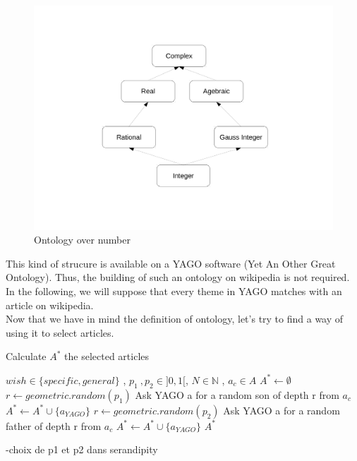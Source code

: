 \documentclass[11pt]{article}
\theoremstyle{plain}
\theoremstyle{definition}
\theoremstyle{remark}
\begin{document}
\begin{figure}[!h]
	\centering
    \includegraphics[scale = 0.3]{ExOntology.pdf}
    \caption{Ontology over number}
\end{figure}

This kind of strucure is available on a YAGO software (Yet An Other Great Ontology). Thus, the building of such an ontology on wikipedia is not required. In the following, we will suppose that every theme in YAGO matches with an article on wikipedia. \\
Now that we have in mind the definition of ontology, let's try to find a way of using it to select articles.\\


\begin{algorithm}
  \caption{Calculate $A^*$ the selected articles}
  \begin{algorithmic}
    \REQUIRE $wish \in \{specific , general\}$ , $p_1 \: ,p_2 \in ]0,1[ $, $N \in \mathbb{N}$ , $a_c \in A$
    \STATE $A^* \leftarrow \emptyset$
    \STATE $ r \leftarrow geometric.random(p_1)$
    \STATE Ask YAGO a for a random son of depth r from $a_c$
    \STATE $ A^* \leftarrow A^* \cup \{a_{YAGO}\}$
    \ELSE
    \STATE $ r \leftarrow geometric.random(p_2)$
    \STATE Ask YAGO a for a random father of depth r from $a_c$
    \STATE $ A^*  \leftarrow A^* \cup \{a_{YAGO}\}$ 
    \ENDIF
    \ENDWHILE
    \RETURN $A^*$
  \end{algorithmic}
\end{algorithm}

-choix de p1 et p2 dans serandipity
\end{document}
